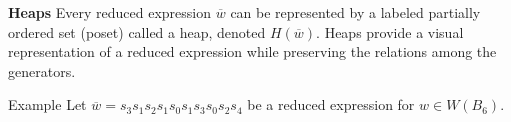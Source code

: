 \documentclass{beamer}
\newcommand{\w}{\overline{w}}
\newcommand\heapblock[4]{\fill[fill=#4, fill opacity=0.35, draw=#4, line width=1.1pt, rounded corners,shift={(\xxaxis:#1)},shift={(\yyaxis:#2)}] (-1,-1) rectangle (1,1);\node at (#1,#2) {\footnotesize $#3$};}
\newcommand\xxaxis{0}
\newcommand\yyaxis{90}
\begin{document}

\begin{frame}{\textbf{Heaps}}
Every reduced expression $\w$ can be represented by a labeled partially ordered set (poset) called a heap, denoted $H(\w)$. Heaps provide a visual representation of a reduced expression while preserving the relations among the generators.

\pause

\begin{block}{Example}
Let $\w=s_3s_1s_2s_1s_0s_1s_3s_0s_2s_4$ be a reduced expression for $w \in W(B_6)$. \pause
\begin{columns}
\begin{column}{0.4\textwidth}
\begin{figure}\centering
{}	
\end{figure}
\end{column}
\pause
\begin{column}{0.4\textwidth}
\begin{figure}\centering
{}
\end{figure}	
\end{column}
\end{columns}
\end{block}
	
\end{frame}
\end{document}

